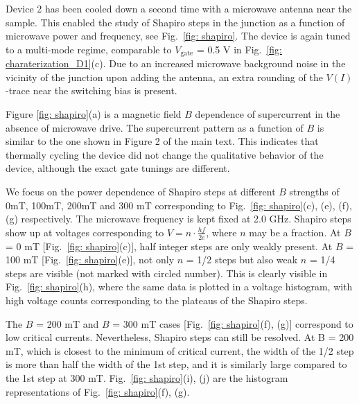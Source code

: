 \documentclass[english, aps,prb,showpacs,preprintnumber,amsmath,amssymb,superscriptaddress,reprint]{revtex4-1}
\begin{document}
Device 2 has been cooled down a second time with a microwave antenna near the sample. 
This enabled the study of Shapiro steps in the junction as a function of microwave power and frequency, see Fig.~\ref{fig: shapiro}.
The device is again tuned to a multi-mode regime, comparable to $V_\mathrm{gate}$ = 0.5 V in Fig.~\ref{fig: charaterization_D1}(c). 
Due to an increased microwave background noise in the vicinity of the junction upon adding the antenna, an extra rounding of the $V\left(I\right)$-trace near the switching bias is present. 

Figure \ref{fig: shapiro}(a) is a magnetic field $B$ dependence of supercurrent in the absence of microwave drive. 
The supercurrent pattern as a function of $B$ is similar to the one shown in Figure 2 of the main text. 
This indicates that thermally cycling the device did not change the qualitative behavior of the device, although the exact gate tunings are different. 

We focus on the power dependence of Shapiro steps at different $B$ strengths of 0mT, 100mT, 200mT and 300 mT corresponding to Fig.~\ref{fig: shapiro}(c), (e), (f), (g) respectively. 
The microwave frequency is kept fixed at 2.0 GHz. Shapiro steps show up at voltages corresponding to $V=n\cdot\frac{hf}{2e}$, where $n$ may be a fraction. At $B$ = 0 mT [Fig.~\ref{fig: shapiro}(c)], half integer steps are only weakly present. 
At $B$ = 100 mT [Fig.~\ref{fig: shapiro}(e)], not only $n$ = 1/2 steps but also weak $n$ = 1/4 steps are visible (not marked with circled number). 
This is clearly visible in Fig.~\ref{fig: shapiro}(h), where the same data is plotted in a voltage histogram, with high voltage counts corresponding to the plateaus of the Shapiro steps.

The $B$ = 200 mT and $B$ = 300 mT cases [Fig.~\ref{fig: shapiro}(f), (g)] correspond to low critical currents. Nevertheless, Shapiro steps can still be resolved. At B = 200 mT, which is closest to the minimum of critical current, the width of the 1/2 step is more than half the width of the 1st step, and it is similarly large compared to the 1st step at 300 mT. Fig.~\ref{fig: shapiro}(i), (j) are the histogram representations of Fig.~\ref{fig: shapiro}(f), (g).
\end{document}
